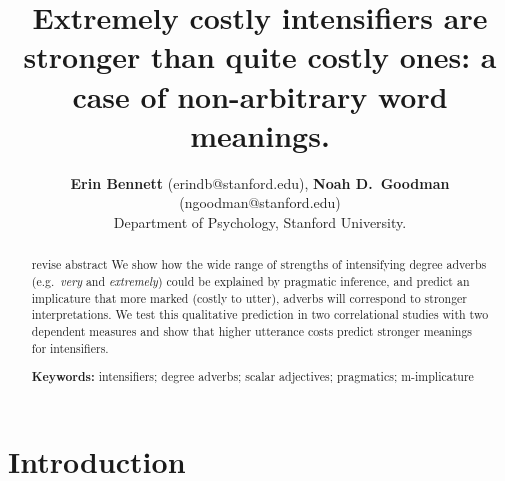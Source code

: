 \documentclass[10pt,letterpaper]{article}
\title{Extremely costly intensifiers are stronger than quite costly ones: a case of non-arbitrary word meanings.}
\author{{\large \bf Erin Bennett} (erindb@stanford.edu), {\large \bf Noah D.~Goodman} (ngoodman@stanford.edu)\\
  Department of Psychology, Stanford University.}
\newcommand{\w}[1]{\emph{#1}}
\newcommand{\todo}[1]{{\color{red}#1}}
\begin{document}
\maketitle

\begin{abstract}

\todo{revise abstract}
We show how the wide range of strengths of intensifying degree adverbs (e.g.~\w{very} and \w{extremely}) could be explained by pragmatic inference, and predict an implicature that more marked (costly to utter), adverbs will correspond to stronger interpretations. We test this qualitative prediction in two correlational studies with two dependent measures and show that higher utterance costs predict stronger meanings for intensifiers.

\textbf{Keywords:} 
intensifiers; degree adverbs; scalar adjectives; pragmatics; m-implicature
\end{abstract}

\section{Introduction}

\end{document}
